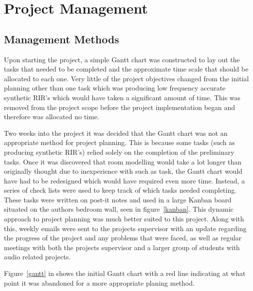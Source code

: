 \documentclass[../../main.tex]{subfiles}
\begin{document}
\section{Project Management}
	\subsection{Management Methods}
	Upon starting the project, a simple Gantt chart was constructed to lay out the tasks that needed to be completed and the approximate time scale that should be allocated to each one. Very little of the project objectives changed from the initial planning other than one task which was producing low frequency accurate synthetic \ac{RIR}'s which would have taken a significant amount of time. This was removed from the project scope before the project implementation began and therefore was allocated no time.

	Two weeks into the project it was decided that the Gantt chart was not an appropriate method for project planning. This is because some tasks (such as producing synthetic \ac{RIR}'s) relied solely on the completion of the preliminary tasks. Once it was discovered that room modelling would take a lot longer than originally thought due to inexperience with such as task, the Gantt chart would have had to be redesigned which would have required even more time. Instead, a series of check lists were used to keep track of which tasks needed completing. These tasks were written on post-it notes and used in a large Kanban board situated on the authors bedroom wall, seen in figure~\ref{kanban}. This dynamic approach to project planning was much better suited to this project.  Along with this, weekly emails were sent to the projects supervisor with an update regarding the progress of the project and any problems that were faced, as well as regular meetings with both the projects supervisor and a larger group of students with audio related projects.

	Figure~\ref{gantt} in  shows the initial Gantt chart with a red line indicating at what point it was abandoned for a more appropriate planing method.
\end{document}
